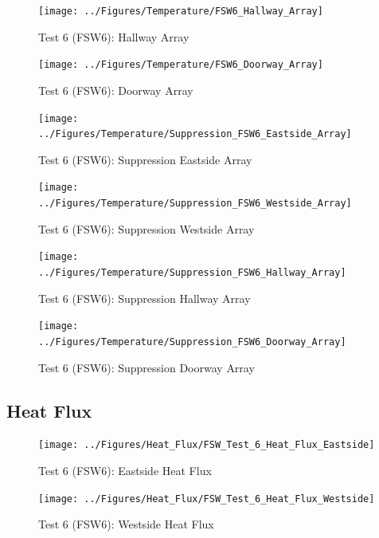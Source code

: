 \documentclass[12pt,oneside]{book}
\begin{document}
\begin{figure}[!ht]
	\texttt{[image: ../Figures/Temperature/FSW6\_Hallway\_Array]}
	\caption{Test 6 (FSW6): Hallway Array}
	\label{fig:Test_6_Hallway_Array}
\end{figure}

\begin{figure}[!ht]
	\texttt{[image: ../Figures/Temperature/FSW6\_Doorway\_Array]}
	\caption{Test 6 (FSW6): Doorway Array}
	\label{fig:Test_6_Doorway_Array}
\end{figure}

\begin{figure}[!ht]
	\texttt{[image: ../Figures/Temperature/Suppression\_FSW6\_Eastside\_Array]}
	\caption{Test 6 (FSW6): Suppression Eastside Array}
	\label{fig:Test_6_Suppression_Eastside_Array}
\end{figure}

\begin{figure}[!ht]
	\texttt{[image: ../Figures/Temperature/Suppression\_FSW6\_Westside\_Array]}
	\caption{Test 6 (FSW6): Suppression Westside Array}
	\label{fig:Test_6_Suppression_Westside_Array}
\end{figure}

\begin{figure}[!ht]
	\texttt{[image: ../Figures/Temperature/Suppression\_FSW6\_Hallway\_Array]}
	\caption{Test 6 (FSW6): Suppression Hallway Array}
	\label{fig:Test_6_Suppression_Hallway_Array}
\end{figure}

\begin{figure}[!ht]
	\texttt{[image: ../Figures/Temperature/Suppression\_FSW6\_Doorway\_Array]}
	\caption{Test 6 (FSW6): Suppression Doorway Array}
	\label{fig:Test_6_Suppression_Doorway_Array}
\end{figure}

\subsection{Heat Flux}
\label{subsec:Heat_Flux}

\begin{figure}[!ht]
	\texttt{[image: ../Figures/Heat\_Flux/FSW\_Test\_6\_Heat\_Flux\_Eastside]}
	\caption{Test 6 (FSW6): Eastside Heat Flux}
	\label{fig:Test_6_Eastside_Heat_Flux}
\end{figure}

\begin{figure}[!ht]
	\texttt{[image: ../Figures/Heat\_Flux/FSW\_Test\_6\_Heat\_Flux\_Westside]}
	\caption{Test 6 (FSW6): Westside Heat Flux}
	\label{fig:Test_6_Westside_Heat_Flux}
\end{figure}
\end{document}
